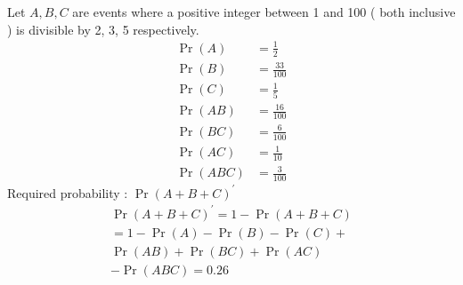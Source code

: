 Let $A,B,C$ are events where a positive integer between 1 and 100 ( both inclusive ) is divisible by 2, 3, 5 respectively.
\begin{align}
  \Pr(A) &= \frac{1}{2}\\
  \Pr(B) &= \frac{33}{100} \\
  \Pr(C) &= \frac{1}{5} \\
  \Pr(AB) &= \frac{16}{100} \\
  \Pr(BC) &= \frac{6}{100} \\
  \Pr(AC) &= \frac{1}{10} \\
  \Pr(ABC) &= \frac{3}{100} 
\end{align}
Required probability : $\Pr(A+B+C)^{\prime}$
\begin{multline}
\Pr(A+B+C)^{\prime}  = 1-\Pr(A+B+C) \\  
 = 1-\Pr(A)-\Pr(B)-\Pr(C)+{}\\ \Pr(AB) + \Pr(BC)+ \Pr(AC){}\\
 -\Pr(ABC) 
    = 0.26 
\end{multline}